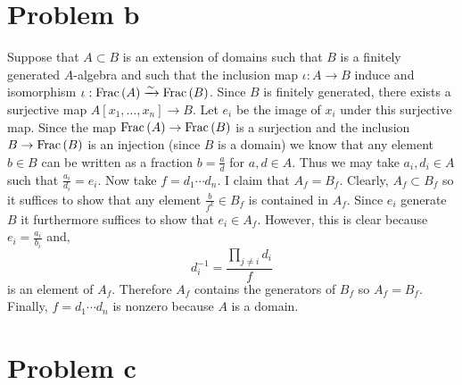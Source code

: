 \documentclass[12pt]{article}
\begin{document}
\section{Problem b}

Suppose that $A \subset B$ is an extension of domains such that $B$ is a finitely generated $A$-algebra and such that the inclusion map $\iota : A \to B$ induce and isomorphism $\iota : \mathrm{Frac}\left(A\right) \xrightarrow{\sim} \mathrm{Frac}\left(B\right)$. Since $B$ is finitely generated, there exists a surjective map $A[x_1, \dots, x_n] \to B$. Let $e_i$ be the image of $x_i$ under this surjective map. Since the map $\mathrm{Frac}\left(A\right) \to \mathrm{Frac}\left(B\right)$ is a surjection and the inclusion $B \to \mathrm{Frac}\left(B\right)$ is an injection (since $B$ is a domain) we know that any element $b \in B$ can be written as a fraction $b = \frac{a}{d}$ for $a,d \in A$. Thus we may take $a_i, d_i \in A$ such that $\frac{a_i}{d_i} = e_i$. Now take $f = d_1 \cdots d_n$. I claim that $A_f = B_f$. Clearly, $A_f \subset B_f$ so it suffices to show that any element $\frac{b}{f^k} \in B_f$ is contained in $A_f$. Since $e_i$ generate $B$ it furthermore suffices to show that $e_i \in A_f$. However, this is clear because $e_i = \frac{a_i}{b_i}$ and,
\[ d_i^{-1} = \frac{\prod\limits_{j \neq i} d_i}{f} \]
is an element of $A_f$. Therefore $A_f$ contains the generators of $B_f$ so $A_f = B_f$. Finally, $f = d_1 \cdots d_n$ is nonzero because $A$ is a domain. 

\section{Problem c}
\end{document}
